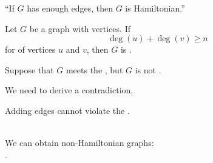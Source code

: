 
\begin{frame}{}

  \begin{center}
    ``If $G$ has enough edges, then $G$ is Hamiltonian.''
  \end{center}
\end{frame}

\begin{frame}{}
  \begin{theorem}
    Let $G$ be a  graph with  vertices. If
    \[
      \deg(u) + \deg(v) \ge n
    \]
    for  of  vertices $u$ and $v$,
    then $G$ is .
  \end{theorem}

  \pause
\end{frame}

\begin{frame}{}
  \begin{center}

    \pause
    \vspace{0.30cm}
    Suppose that $G$ meets the ,
    but $G$ is not .

    \pause
    \vspace{0.30cm}
    We need to derive a contradiction.

    \pause
    \vspace{0.80cm}
    Adding edges cannot violate the .

    \pause
    \vspace{0.80cm}
     \\[5pt] \pause
    We can obtain  non-Hamiltonian graphs: \\[3pt] \pause
    .
  \end{center}
\end{frame}

